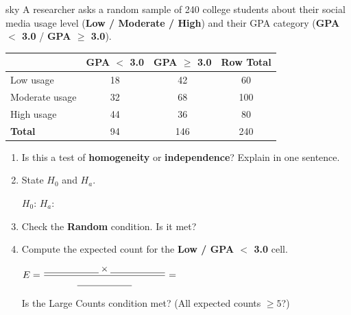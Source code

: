 \documentclass[10pt]{article}
\begin{document}
\namepartnerperiod

\vspace{0.08in}

\begin{scenariobox}{sky}
A researcher asks a random sample of 240 college students about their social media
usage level (\textbf{Low / Moderate / High}) and their GPA category
(\textbf{GPA $<$ 3.0} / \textbf{GPA $\ge$ 3.0}).

\renewcommand{\arraystretch}{1.4}
\begin{center}
\begin{tabular}{@{} l c c c @{}}
\hline
                 & \textbf{GPA $<$ 3.0} & \textbf{GPA $\ge$ 3.0} & \textbf{Row Total} \\
\hline
Low usage        & 18  & 42  & 60  \\
Moderate usage   & 32  & 68  & 100 \\
High usage       & 44  & 36  & 80  \\
\hline
\textbf{Total}   & 94  & 146 & 240 \\
\hline
\end{tabular}
\end{center}
\end{scenariobox}

\vspace{0.04in}

\begin{tcolorbox}[colback=white, colframe=black!40, title=\textbf{Tier R --- Recall},
    fonttitle=\bfseries, arc=2mm, left=3mm, right=3mm, top=2mm, bottom=2mm]

\begin{enumerate}[label=\alph*., itemsep=6pt]

  \item Is this a test of \textbf{homogeneity} or \textbf{independence}? Explain in one sentence.

  \item State $H_0$ and $H_a$.

        $H_0$: \writeline
        $H_a$: \writeline

  \item Check the \textbf{Random} condition. Is it met?
        \writeline

  \item Compute the expected count for the \textbf{Low / GPA $<$ 3.0} cell.

        $E = \dfrac{\blank{2cm} \times \blank{2cm}}{\blank{2cm}} = $ \blank{2.5cm}

        Is the Large Counts condition met? (All expected counts $\ge 5$?) \blank{2cm}

\end{enumerate}
\end{tcolorbox}
\end{document}
